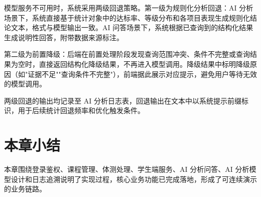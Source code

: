 模型服务不可用时，系统采用两级回退策略。第一级为规则化分析回退：AI 分析场景下，系统直接基于统计对象中的达标率、等级分布和各项目表现生成规则化结论文本，格式与模型输出一致。AI 问答场景下，系统根据已查询到的结构化结果生成说明性回答，附带数据来源标注。

第二级为前置降级：后端在前置处理阶段发现查询范围冲突、条件不完整或查询结果为空时，直接返回结构化降级结果，不再进入模型调用。降级结果中标明降级原因（如"证据不足""查询条件不完整"），前端据此展示对应提示，避免用户等待无效的模型调用。

两级回退的输出均记录至 AI 分析日志表，回退输出在文本中以系统提示前缀标识，用于后续统计回退频率和优化触发条件。

\section{本章小结}

本章围绕登录鉴权、课程管理、体测处理、学生端服务、AI 分析问答、AI 分析模型设计和日志追溯说明了实现过程，核心业务功能已完成落地，形成了可连续演示的业务链路。